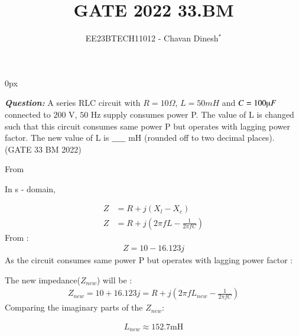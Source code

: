 \documentclass[journal,12pt,twocolumn]{IEEEtran}
\theoremstyle{remark}
\begin{document}
\parindent 0px

\vspace{3cm}

\title{GATE 2022 33.BM}
\author{EE23BTECH11012 - Chavan Dinesh$^{*}$%
}
\maketitle
\newpage
\bigskip

\renewcommand{\thefigure}{\arabic{figure}}
\renewcommand{\thetable}{\arabic{table}}
\large\textbf{\textsl{Question:}}
A series RLC circuit with $R = 10 \Omega$, $L = 50 mH$ and $C = 100 \micro F$ connected to
$200$ V, $50$ Hz supply consumes power P. The value of L is changed such that this
circuit consumes same power P but operates with lagging power factor. The new
value of L is $\_\_\_\_\_$ mH (rounded off to two decimal places).
\hfill(GATE 33 BM 2022)

\solution

\begin{table}[htbp]
    \centering
    
    \caption{}
    \label{tab:input_parameters.33.BM.2022}
\end{table}

\begin{figure}[!ht]
    \centering
    
    \caption{}
    \label{fig:fig1.33.BM.2022}
\end{figure}

From 

In s - domain,
\begin{figure}[htbp]
    \centering
    
\end{figure}

 \begin{align}
         Z &= R +j(X_l - X_c)\\ 
         Z &= R +j\left(2\pi fL - \frac{1}{2\pi fC}\right)\label{eq:Z_impedence.bm.33.2022}
 \end{align}
From :
  \begin{align}
      Z = 10 -  16.123 j 
  \end{align}
As the circuit consumes same power P but operates with lagging power factor : 

The new impedance($Z_{new}$) will be :
\begin{align}
    Z_{new}=  10 + 16.123 j =  R +j\left(2\pi fL_{new} - \frac{1}{2\pi fC}\right)
\end{align}
Comparing the imaginary parts of the $Z_{new}$:

\begin{align}
    L_{new} \approx 152.7 \text{mH}
\end{align}



\end{document}
